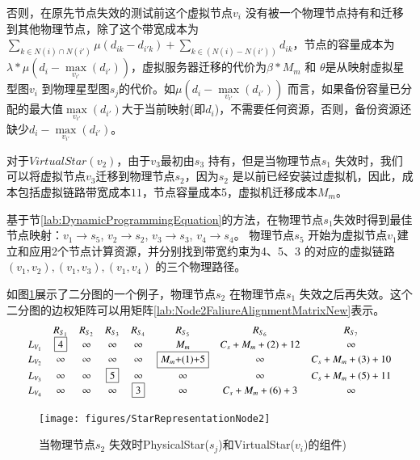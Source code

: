 否则，在原先节点失效的测试前这个虚拟节点$v_i$ 没有被一个物理节点持有和迁移到其他物理节点，除了这个带宽成本为${\sum\limits_{k \in N(i) \cap N(i')} {\mu({d_{ik}} - {d_{i'k}})}  + \sum\limits_{k \in \left( {N(i) - N(i')} \right)} {{d_{ik}}} }$，节点的容量成本为${\lambda * \mu({d_i} - \mathop {\max }\limits_{{v_{i'}}} \left( {{d_{i'}}} \right))}$，虚拟服务器迁移的代价为${\beta * {M_m}}$ 和 $\theta$是从映射虚拟星型图$v_i$ 到物理星型图$s_j$的代价。如${\mu({d_i} - \mathop {\max }\limits_{{v_{i'}}} \left( {{d_{i'}}} \right))}$ 而言，如果备份容量已分配的最大值${\mathop {\max }\limits_{{v_{i'}}} \left( {{d_{i'}}} \right)}$大于当前映射(即$d_i$)，不需要任何资源，否则，备份资源还缺少${{d_i} - \mathop {\max }\limits_{{v_{i'}}} \left( {{d_{i'}}} \right)}$。

对于$VirtualStar(v_2)$，由于$v_3$最初由$s_3$ 持有，但是当物理节点$s_1$ 失效时，我们可以将虚拟节点$v_3$迁移到物理节点$s_2$，因为$s_2$ 是以前已经安装过虚拟机，因此，成本包括虚拟链路带宽成本$11$，节点容量成本5，虚拟机迁移成本$M_m$。

基于节\ref{lab:DynamicProgrammingEquation}的方法，在物理节点$s_1$失效时得到最佳节点映射：$v_1 \rightarrow s_5$, $v_2 \rightarrow s_2$, $v_3 \rightarrow s_3$, $v_4 \rightarrow s_4$。 物理节点$s_5$ 开始为虚拟节点$v_1$建立和应用2个节点计算资源，并分别找到带宽约束为4、5、3 的对应的虚拟链路$(v_1,v_2),(v_1,v_3),(v_1,v_4)$ 的三个物理路径。

如图\ref{fig:StarRepresentationNode2}展示了二分图的一个例子，物理节点$s_2$ 在物理节点$s_1$ 失效之后再失效。这个二分图的边权矩阵可以用矩阵\ref{lab:Node2FaliureAlignmentMatrixNew}表示。
\begin{equation*}
\small{
 {\begin{array}{*{20}{c}}
&R_{S_{1}}&R_{S_{2}}&R_{S_3}&R_{S_4}&R_{S_5}&R_{S_6}&R_{S_{7}}\\
{L_{V_1}}&\fbox{4}&\infty&\infty&\infty&M_{m}&C_{s}+M_{m}+(2)+12&\infty\\
L_{V_2}&\infty&\infty&\infty&\infty&\fbox{$M_{m}$+(1)+5}&\infty&C_{s}+M_{m}+(3)+10\\
L_{V_3}&\infty&\infty&\fbox{5}&\infty&\infty&\infty&C_{s}+M_{m}+(5)+11\\
L_{V_4}&\infty&\infty&\infty&\fbox{3}&\infty&C_{s}+M_{m}+(6)+3&\infty\\
\end{array}}
}
\label{lab:Node2FaliureAlignmentMatrixNew}
\end{equation*}

\begin{figure}
\centering
\texttt{[image: figures/StarRepresentationNode2]}\\
  \caption{当物理节点$s_2$ 失效时PhysicalStar($s_j$)和VirtualStar($v_i$)的组件)}\label{fig:StarRepresentationNode2}
\end{figure}

